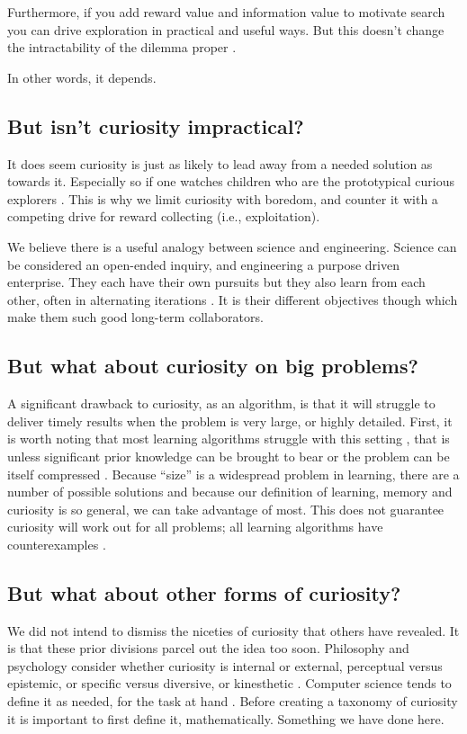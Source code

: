 Furthermore, if you add reward value and information value to motivate search you can drive exploration in practical and useful ways. But this doesn't change the intractability of the dilemma proper \cite{Thrun1992a,Dayan1996,Findling2018,Gershman2018b}. 

In other words, it depends. 


\subsection*{But isn't curiosity impractical?}
It does seem curiosity is just as likely to lead away from a needed solution as towards it. Especially so if one watches children who are the prototypical curious explorers \cite{Sumner2019,Kidd2015}. This is why we limit curiosity with boredom, and counter it with a competing drive for reward collecting (i.e., exploitation). 

We believe there is a useful analogy between science and engineering. Science can be considered an open-ended inquiry, and engineering a purpose driven enterprise. They each have their own pursuits but they also learn from each other, often in alternating iterations \cite{Gupta2006}. It is their different objectives though which make them such good long-term collaborators.


\subsection*{But what about curiosity on big problems?}
A significant drawback to curiosity, as an algorithm, is that it will struggle to deliver timely results when the problem is very large, or highly detailed. First, it is worth noting that most learning algorithms struggle with this setting \cite{MacKay2003,Sutton2018}, that is unless significant prior knowledge can be brought to bear \cite{Zhang2020,Sutton2018} or the problem can be itself compressed \cite{Ha2018a,Fister2019}. Because ``size'' is a widespread problem in learning, there are a number of possible solutions and because our definition of learning, memory and curiosity is so general, we can take advantage of most. This does not guarantee curiosity will work out for all problems; all learning algorithms have counterexamples \cite{Wolpert1997}. 


\subsection*{But what about other forms of curiosity?}
We did not intend to dismiss the niceties of curiosity that others have revealed. It is that these prior divisions parcel out the idea too soon. Philosophy and psychology consider whether curiosity is internal or external, perceptual versus epistemic, or specific versus diversive, or kinesthetic \cite{Kidd2015,Berlyne1950,Zhou2020}. Computer science tends to define it as needed, for the task at hand \cite{Stanley2004,Lehman2011a,Lehman2013,Mouret2015,Colas2020}. Before creating a taxonomy of curiosity it is important to first define it, mathematically. Something we have done here.


